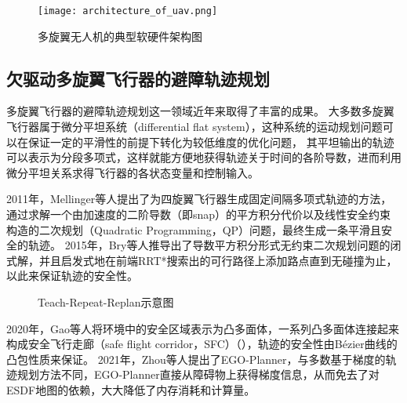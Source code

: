 \begin{figure}[ht]
    \centering
    \texttt{[image: architecture\_of\_uav.png]}
    \caption{多旋翼无人机的典型软硬件架构图\cite{gao2017gradient}}
    \label{fig:architecture_of_uav}
  \end{figure}

\subsection{欠驱动多旋翼飞行器的避障轨迹规划}
多旋翼飞行器的避障轨迹规划这一领域近年来取得了丰富的成果。
大多数多旋翼飞行器属于微分平坦系统（differential flat system）\cite{2003Flatness}，这种系统的运动规划问题可以在保证一定的平滑性的前提下转化为较低维度的优化问题，
其平坦输出的轨迹可以表示为分段多项式，这样就能方便地获得轨迹关于时间的各阶导数，进而利用微分平坦关系求得飞行器的各状态变量和控制输入。

2011年，Mellinger等人提出了为四旋翼飞行器生成固定间隔多项式轨迹的方法\cite{2011minimumsnap}，通过求解一个由加速度的二阶导数（即snap）的平方积分代价以及线性安全约束构造的二次规划（Quadratic Programming，QP）问题，最终生成一条平滑且安全的轨迹。
2015年，Bry等人推导出了导数平方积分形式无约束二次规划问题的闭式解\cite{bry2015aggressive}，并且启发式地在前端RRT*搜索出的可行路径上添加路点直到无碰撞为止，以此来保证轨迹的安全性。
\begin{figure}[!ht]
    \setlength{\subfigcapskip}{-1bp}
    \centering
    \begin{minipage}{\textwidth}

    \centering
    \subfigure{\label{fig:ttr_corridor}}\addtocounter{subfigure}{-2}
    \hspace{0.2em}
    \subfigure{\label{fig:ttr_trajectory}}\addtocounter{subfigure}{-2}
    
    \end{minipage}
    \caption{Teach-Repeat-Replan示意图\cite{gao2020teach}}
    \label{fig:TTR}
\end{figure}
2020年，Gao等人将环境中的安全区域表示为凸多面体\cite{gao2020teach}，一系列凸多面体连接起来构成安全飞行走廊（safe flight corridor，SFC）（），轨迹的安全性由B\'{e}zier曲线的凸包性质来保证。
2021年，Zhou等人提出了EGO-Planner，与多数基于梯度的轨迹规划方法不同，EGO-Planner直接从障碍物上获得梯度信息，从而免去了对ESDF地图的依赖，大大降低了内存消耗和计算量。

